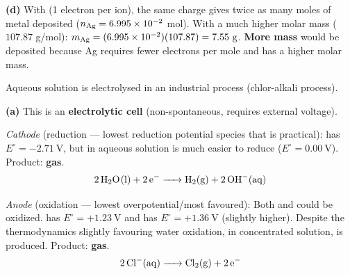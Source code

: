\documentclass[addpoints]{exam}
\begin{document}
\begin{questions}
\begin{solution}[9cm]
\textbf{(d)} With  (1 electron per ion), the same charge gives twice as many moles
of metal deposited ($n_{\ce{Ag}} = 6.995\times10^{-2}$ mol). With a much higher molar mass
($107.87$ g/mol): $m_{\ce{Ag}} = (6.995\times10^{-2})(107.87) = 7.55\ \text{g}$.
\textbf{More mass} would be deposited because Ag requires fewer electrons per mole and has a
higher molar mass.
\end{solution}

\question Aqueous  solution is electrolysed in an industrial process (chlor-alkali
process).
\begin{solution}[10cm]
\textbf{(a)} This is an \textbf{electrolytic cell} (non-spontaneous, requires external voltage).

\textit{Cathode} (reduction --- lowest reduction potential species that is practical):
 has $E^\circ = -2.71\ \text{V}$, but in aqueous solution  is much easier
to reduce ($E^\circ = 0.00\ \text{V}$). Product: \textbf{ gas}.
\[
\ce{2H2O(l) + 2e- -> H2(g) + 2OH-(aq)}
\]

\textit{Anode} (oxidation --- lowest overpotential/most favoured):
Both  and  could be oxidized.  has $E^\circ = +1.23\ \text{V}$
and  has $E^\circ = +1.36\ \text{V}$ (slightly higher). Despite the thermodynamics
slightly favouring water oxidation, in concentrated  solution,  is produced.
Product: \textbf{ gas}.
\[
\ce{2Cl-(aq) -> Cl2(g) + 2e-}
\]


\end{solution}
\end{questions}
\end{document}

